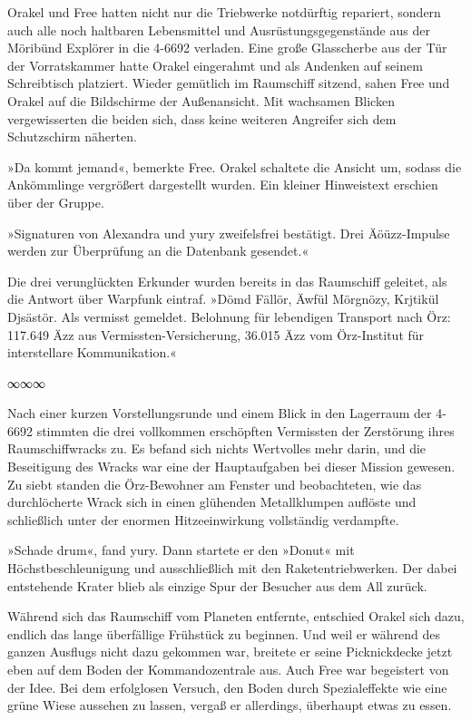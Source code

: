 Orakel und Free hatten nicht nur die Triebwerke notdürftig repariert, sondern auch alle noch haltbaren Lebensmittel und Ausrüstungsgegenstände aus der Möribünd Explörer in die 4-6692 verladen. Eine große Glasscherbe aus der Tür der Vorratskammer hatte Orakel eingerahmt und als Andenken auf seinem Schreibtisch platziert. Wieder gemütlich im Raumschiff sitzend, sahen Free und Orakel auf die Bildschirme der Außenansicht. Mit wachsamen Blicken vergewisserten die beiden sich, dass keine weiteren Angreifer sich dem Schutzschirm näherten.

»Da kommt jemand«, bemerkte Free. Orakel schaltete die Ansicht um, sodass die Ankömmlinge vergrößert dargestellt wurden. Ein kleiner Hinweistext erschien über der Gruppe.

»Signaturen von Alexandra und yury zweifelsfrei bestätigt. Drei Äöüzz-Impulse werden zur Überprüfung an die Datenbank gesendet.«

Die drei verunglückten Erkunder wurden bereits in das Raumschiff geleitet, als die Antwort über Warpfunk eintraf. »Dömd Fällör, Äwfül Mörgnözy, Krjtikül Djsästör. Als vermisst gemeldet. Belohnung für lebendigen Transport nach Örz: 117.649 Äzz aus Vermissten-Versicherung, 36.015 Äzz vom Örz-Institut für interstellare Kommunikation.«

\begin{center}
    ∞∞∞
\end{center}

Nach einer kurzen Vorstellungsrunde und einem Blick in den Lagerraum der 4-6692 stimmten die drei vollkommen erschöpften Vermissten der Zerstörung ihres Raumschiffwracks zu. Es befand sich nichts Wertvolles mehr darin, und die Beseitigung des Wracks war eine der Hauptaufgaben bei dieser Mission gewesen. Zu siebt standen die Örz-Bewohner am Fenster und beobachteten, wie das durchlöcherte Wrack sich in einen glühenden Metallklumpen auflöste und schließlich unter der enormen Hitzeeinwirkung vollständig verdampfte.

»Schade drum«, fand yury. Dann startete er den »Donut« mit Höchstbeschleunigung und ausschließlich mit den Raketentriebwerken. Der dabei entstehende Krater blieb als einzige Spur der Besucher aus dem All zurück.

Während sich das Raumschiff vom Planeten entfernte, entschied Orakel sich dazu, endlich das lange überfällige Frühstück zu beginnen. Und weil er während des ganzen Ausflugs nicht dazu gekommen war, breitete er seine Picknickdecke jetzt eben auf dem Boden der Kommandozentrale aus. Auch Free war begeistert von der Idee. Bei dem erfolglosen Versuch, den Boden durch Spezialeffekte wie eine grüne Wiese aussehen zu lassen, vergaß er allerdings, überhaupt etwas zu essen.

